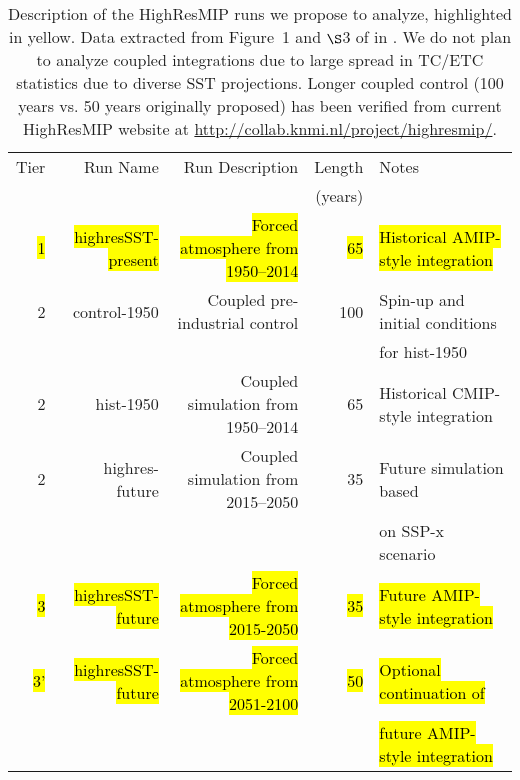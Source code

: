 \documentclass[11pt]{article}
\begin{document}

 

\newpage
\begin{table}[h]
\centering
\begin{tabular}{|r|r|r|r|l|}
\hline
Tier & Run Name & Run Description & Length & Notes \\
 & & & (years) & \\
\hline
{\hl{1}} & {\hl{highresSST-present}} & {\hl{Forced atmosphere from 1950--2014}}  & {\hl{65}} & {\hl{Historical AMIP-style integration}} \\
2 & control-1950 & Coupled pre-industrial control & 100 & Spin-up and initial conditions \\
& & & & for hist-1950  \\
2 & hist-1950 & Coupled simulation from 1950--2014 & 65 & Historical CMIP-style integration \\
2 & highres-future & Coupled simulation from 2015--2050 & 35 & Future simulation based \\
& & & & on SSP-x scenario \\
{\hl{3}} & {\hl{highresSST-future}} & {\hl{Forced atmosphere from 2015-2050}}    & {\hl{35}} & {\hl{Future AMIP-style integration}} \\
{\hl{3'}} & {\hl{highresSST-future}} & {\hl{Forced atmosphere from 2051-2100}}   & {\hl{50}} & {\hl{Optional continuation of}} \\ 
& & & & {\hl{future AMIP-style integration}} \\
\hline
\end{tabular}
\caption{\label{tab:transfer} Description of the HighResMIP runs we propose to analyze, highlighted in yellow.  Data extracted from Figure~1 and $\S$3 of in \cite{Haarsma16}.  We do not plan to analyze coupled integrations due to large spread in TC/ETC statistics due to diverse SST projections.  Longer coupled control (100 years vs. 50 years originally proposed) has been verified from current HighResMIP website at \url{http://collab.knmi.nl/project/highresmip/}.}
\end{table}
\end{document}
